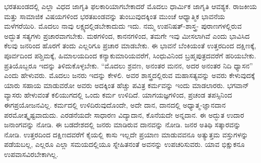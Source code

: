 ಭರತಖಂಡದಲ್ಲಿ ಎಲ್ಲಾ ವಿಧದ ಜಾಗೃತಿ ಫಲಕಾರಿಯಾಗಬೇಕಾದರೆ ಮೊದಲು ಧಾರ್ಮಿಕ ಜಾಗೃತಿ ಆವಶ್ಯಕ. ರಾಜಕೀಯ ಮತ್ತು ಸಾಮಾಜಿಕ ವಿಷಯಗಳಿಂದ ಭರತಖಂಡವನ್ನು ತುಂಬುವುದಕ್ಕಿಂತ ಮುಂಚೆ ಆಧ್ಯಾತ್ಮಿಕ ಭಾವನೆಯ ಮಳೆಗರೆಯಿರಿ. ಮೊದಲು ನಾವು ಲಕ್ಷ್ಯದಲ್ಲಿಡಬೇಕಾದುದು ಇದು. ನಮ್ಮ ಉಪನಿಷತ್​-ಶಾಸ್ತ್ರ- ಪುರಾಣಗಳಲ್ಲಿರುವ ಅದ್ಭುತ ಸತ್ಯಗಳು ಪ್ರಚಾರವಾಗಬೇಕು. ಮಠಗಳಿಂದ, ಕಾನನಗಳಿಂದ, ತಮಗೇ ಇವು ಮೀಸಲಾಗಿವೆ ಎಂದು ಭಾವಿಸಿದ ಕೆಲವು ಜನರಿಂದ ಹೊರಗೆ ತಂದು ಎಲ್ಲರಿಗೂ ಪ್ರಚಾರ ಮಾಡಬೇಕು. ಈ ಭಾವನೆ ಬೆಂಕಿಯಂತೆ ಉತ್ತರದಿಂದ ದಕ್ಷಿಣಕ್ಕೆ, ಪೂರ್ವದಿಂದ ಪಶ್ಚಿಮಕ್ಕೆ, ಹಿಮಾಲಯದಿಂದ ಕನ್ಯಾಕುಮಾರಿಯವರೆಗೆ, ಸಿಂಧುವಿನಿಂದ ಬ್ರಹ್ಮಪುತ್ರದವರೆಗೆ ಹರಿಯಬೇಕು. ಪ್ರತಿಯೊಬ್ಬರೂ ಇದನ್ನು ತಿಳಿದುಕೊಳ್ಳಬೇಕು. “ಮೊದಲು ಶ್ರವಣ, ಅನಂತರ ಮನನ, ಅದರ ಅನಂತರ ನಿದಿ ಧ್ಯಾಸನ” ಎಂದು ಹೇಳುವರು. ಮೊದಲು ಜನರು ಇದನ್ನು ಕೇಳಲಿ. ಅವರ ಶಾಸ್ತ್ರದಲ್ಲಿರುವ ಮಹಾಸತ್ಯವನ್ನು ಅವರು ಕೇಳುವುದಕ್ಕೆ ಯಾರು ಸಹಾಯ ಮಾಡುವರೋ ಅವರು ಅದಕ್ಕಿಂತ ಹೆಚ್ಚು ಪವಿತ್ರ ಕರ್ಮವನ್ನು ಇಂದು ಮಾಡಲಾರರು. ಭಗವಾನ್​ ವ್ಯಾಸರು ಹೇಳುವಂತೆ ಕಲಿಯುಗದಲ್ಲಿ ಒಂದು ಕರ್ಮ ಉಳಿದಿದೆ. ಯಾಗಯಜ್ಞಗಳಿಂದ, ಪ್ರಚಂಡ ತಪಸ್ಸಿನಿಂದ ಈಗ\break ಪ್ರಯೋಜನವಿಲ್ಲ. ಕರ್ಮದಲ್ಲಿ ಉಳಿದಿರುವುದೊಂದೇ, ಅದೇ ದಾನ, ದಾನದಲ್ಲಿ ಅಧ್ಯಾತ್ಮ-ಜ್ಞಾನದಾನ ಪರಮೋತ್ಕೃಷ್ಟವಾದುದು. ಎರಡನೆಯದೇ ಸಾಧಾರಣ ವಿದ್ಯಾದಾನ, ಕೊನೆಯದೇ ಅನ್ನದಾನ. ಈ ಅದ್ಭುತ ಉದಾರ ಜನಾಂಗವನ್ನು ನೋಡಿ. ಈ ಬಡದೇಶದಲ್ಲಿ ಜನರು ಮಾಡಿರುವ ದಾನವನ್ನು ನೋಡಿ. ಜನರ ಅತಿಥಿ ಸತ್ಕಾರವನ್ನು ನೋಡಿ. ಉತ್ತರದಿಂದ ದಕ್ಷಿಣದವರೆಗೆ ಕೈಯಲ್ಲಿ ಕಾಸು ಇಲ್ಲದೇ ಪ್ರಯಾಣ ಮಾಡುವವನೂ ಅತ್ಯುತ್ತಮ ವಸ್ತುಗಳನ್ನು ಪಡೆಯಬಲ್ಲ, ಎಲ್ಲರೂ ಎಲ್ಲಾ ಸಮಯದಲ್ಲಿಯೂ ಸ್ನೇಹಿತನಂತೆ ಅವನನ್ನು ಉಪಚರಿಸುವರು. ಯಾವ ಭಿಕ್ಷುಕನೂ ಉಪವಾಸವಿರಬೇಕಾಗಿಲ್ಲ.

